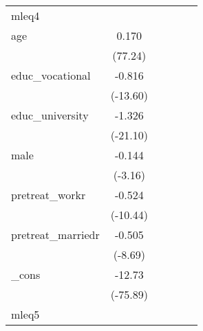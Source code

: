 {\begin{tabular}{l*{5}{c}}
\hline
mleq4       &                     &                     &                     &                     &                     \\
age         &       0.170\sym{***}&                     &                     &                     &                     \\
            &     (77.24)         &                     &                     &                     &                     \\
[1em]
educ\_vocational&      -0.816\sym{***}&                     &                     &                     &                     \\
            &    (-13.60)         &                     &                     &                     &                     \\
[1em]
educ\_university&      -1.326\sym{***}&                     &                     &                     &                     \\
            &    (-21.10)         &                     &                     &                     &                     \\
[1em]
male        &      -0.144\sym{**} &                     &                     &                     &                     \\
            &     (-3.16)         &                     &                     &                     &                     \\
[1em]
pretreat\_workr&      -0.524\sym{***}&                     &                     &                     &                     \\
            &    (-10.44)         &                     &                     &                     &                     \\
[1em]
pretreat\_marriedr&      -0.505\sym{***}&                     &                     &                     &                     \\
            &     (-8.69)         &                     &                     &                     &                     \\
[1em]
\_cons      &      -12.73\sym{***}&                     &                     &                     &                     \\
            &    (-75.89)         &                     &                     &                     &                     \\
\hline
mleq5       &                     &                     &                     &                     &                     \\

\end{tabular}}
